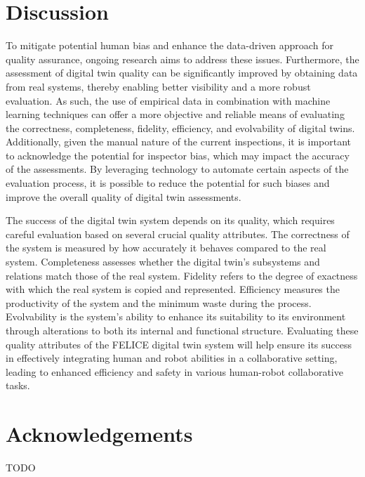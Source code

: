 \documentclass{llncs}
\begin{document}
    \section{Discussion}
    \label{section:framework_1}
    To mitigate potential human bias and enhance the data-driven approach for quality assurance, ongoing research aims to address these issues. 
    Furthermore, the assessment of digital twin quality can be significantly improved by obtaining data from real systems, thereby enabling better visibility and a more robust evaluation. As such, the use of empirical data in combination with machine learning techniques can offer a more objective and reliable means of evaluating the correctness, completeness, fidelity, efficiency, and evolvability of digital twins. Additionally, given the manual nature of the current inspections, it is important to acknowledge the potential for inspector bias, which may impact the accuracy of the assessments. 
    By leveraging technology to automate certain aspects of the evaluation process, it is possible to reduce the potential for such biases and improve the overall quality of digital twin assessments.
    
    The success of the digital twin system depends on its quality, which requires careful evaluation based on several crucial quality attributes. The correctness of the system is measured by how accurately it behaves compared to the real system.
    Completeness assesses whether the digital twin's subsystems and relations match those of the real system. 
    Fidelity refers to the degree of exactness with which the real system is copied and represented.
    Efficiency measures the productivity of the system and the minimum waste during the process. 
    Evolvability is the system's ability to enhance its suitability to its environment through alterations to both its internal and functional structure. 
    Evaluating these quality attributes of the FELICE digital twin system will help ensure its success in effectively integrating human and robot abilities in a collaborative setting, leading to enhanced efficiency and safety in various human-robot collaborative tasks.
    \section*{Acknowledgements}
    TODO

    
    
\end{document}
